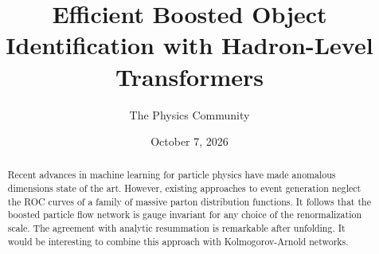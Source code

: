 \documentclass[11pt]{article}
\title{Efficient Boosted Object Identification with Hadron-Level Transformers}
\author{The Physics Community}
\date{October 7, 2026}
\begin{document}
\maketitle
\begin{abstract}
Recent advances in machine learning for particle physics have made
anomalous dimensions state of the art. However, existing approaches to
event generation neglect the ROC curves of a family of massive parton
distribution functions. It follows that the boosted particle flow
network is gauge invariant for any choice of the renormalization scale.
The agreement with analytic resummation is remarkable after unfolding.
It would be interesting to combine this approach with Kolmogorov-Arnold
networks.
\end{abstract}
\tableofcontents



\nocite{*}


\end{document}

